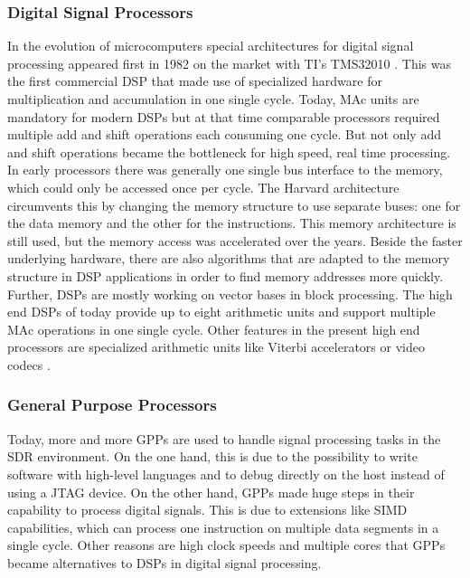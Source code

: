 \subsubsection{Digital Signal Processors}
In the evolution of microcomputers special architectures for digital signal processing appeared first in 1982 on the market with \ac{TI}'s TMS32010 \cite{dsp}. This was the first commercial \ac{DSP} that made use of specialized hardware for multiplication and accumulation in one single cycle. Today, \ac{MAc} units are mandatory for modern \acp{DSP} but at that time comparable processors required multiple add and shift operations each consuming one cycle. But not only add and shift operations became the bottleneck for high speed, real time processing. In early processors there was generally one single bus interface to the memory, which could only be accessed once per cycle. The Harvard architecture circumvents this by changing the memory structure to use separate buses: one for the data memory and the other for the instructions. This memory architecture is still used, but the memory access was accelerated over the years. Beside the faster underlying hardware, there are also algorithms that are adapted to the memory structure in \ac{DSP} applications in order to find memory addresses more quickly. Further, \acp{DSP} are mostly working on vector bases in block processing. The high end \acp{DSP} of today provide up to eight arithmetic units and support multiple \ac{MAc} operations in one single cycle. Other features in the present high end processors are specialized arithmetic units like Viterbi accelerators or video codecs \cite{ti_c64}.

\subsubsection{General Purpose Processors}
Today, more and more \acp{GPP} are used to handle signal processing tasks in the \ac{SDR} environment. On the one hand, this is due to the possibility to write software with high-level languages and to debug directly on the host instead of using a \ac{JTAG} device. On the other hand, \acp{GPP} made huge steps in their capability to process digital signals. This is due to extensions like \ac{SIMD} capabilities, which can process one instruction on multiple data segments in a single cycle. Other reasons are high clock speeds and multiple cores that \acp{GPP} became alternatives to \acp{DSP} in digital signal processing.


